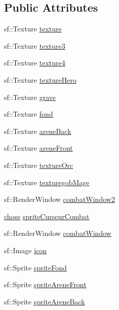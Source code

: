 \subsection*{Public Attributes}
\begin{DoxyCompactItemize}
\item 
sf\+::\+Texture \mbox{\hyperlink{classjeu_ad8d2f3b66c694c4ea003bb5bc6904e1a}{texture}}
\item 
sf\+::\+Texture \mbox{\hyperlink{classjeu_addb3c0ca950f7d707b53d24b4fbfa03e}{texture3}}
\item 
sf\+::\+Texture \mbox{\hyperlink{classjeu_a81c879ee186537a4e177bb29d9dbd7bc}{texture4}}
\item 
sf\+::\+Texture \mbox{\hyperlink{classjeu_acba2731c1a3cf75b98bfba2149a00c8e}{texture\+Hero}}
\item 
sf\+::\+Texture \mbox{\hyperlink{classjeu_a93bcfdf5661eae0e78c7b098e921a5ce}{grave}}
\item 
sf\+::\+Texture \mbox{\hyperlink{classjeu_a4838e0877a52488f9b2adabb5c8860f2}{fond}}
\item 
sf\+::\+Texture \mbox{\hyperlink{classjeu_a5afb10301e3f76d2482ed9859c3db9bc}{arene\+Back}}
\item 
sf\+::\+Texture \mbox{\hyperlink{classjeu_aa42fb5a7a75a731cdabbabafbd8c6afa}{arene\+Front}}
\item 
sf\+::\+Texture \mbox{\hyperlink{classjeu_a0082b3920e78d4471d157a53608e1674}{texture\+Orc}}
\item 
sf\+::\+Texture \mbox{\hyperlink{classjeu_a558ca100cca1c6e3e97adba954a404fe}{texturegob\+Mage}}
\item 
sf\+::\+Render\+Window \mbox{\hyperlink{classjeu_ae6f1468cb8e294592cfe59c9bcf0cea2}{combat\+Window2}}
\item 
\mbox{\hyperlink{classchose}{chose}} \mbox{\hyperlink{classjeu_ae0756dafcae0740b3992d631e38888df}{sprite\+Curseur\+Combat}}
\item 
sf\+::\+Render\+Window \mbox{\hyperlink{classjeu_a2f5828306a38cec451fda205a71ee04c}{combat\+Window}}
\item 
sf\+::\+Image \mbox{\hyperlink{classjeu_a0b83688b41ae808f264c473b6a1d253f}{icon}}
\item 
sf\+::\+Sprite \mbox{\hyperlink{classjeu_a9c949f4b3a6e66d3b311ebdc22f1688c}{sprite\+Fond}}
\item 
sf\+::\+Sprite \mbox{\hyperlink{classjeu_aff95549a72e18bea919e76c1c80032cb}{sprite\+Arene\+Front}}
\item 
sf\+::\+Sprite \mbox{\hyperlink{classjeu_a0c9e3f7c5f2f0cf31bd5da9e3916fcb0}{sprite\+Arene\+Back}}

\end{DoxyCompactItemize}

